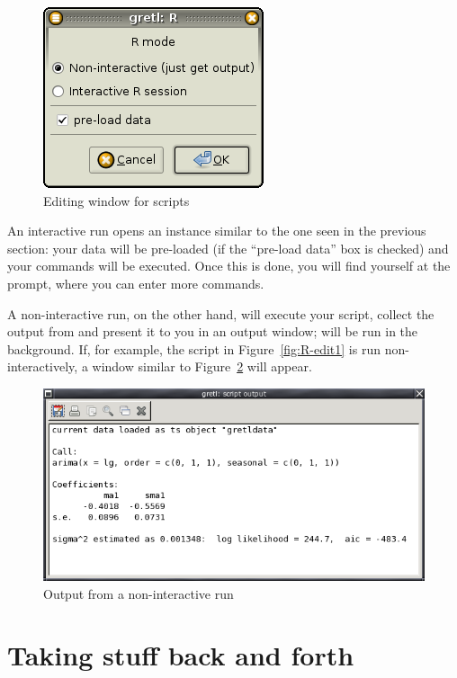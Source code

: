 \begin{figure}[htbp]
  \centering
  \includegraphics[scale=0.7]{figures/R-exec-mode}
  \caption{Editing window for  scripts}
  \label{fig:R-exec-mode}
\end{figure}

An interactive run opens an  instance similar to the one seen
in the previous section: your data will be pre-loaded (if the
``pre-load data'' box is checked) and your commands will
be executed. Once this is done, you will find yourself at the 
prompt, where you can enter more commands.

A non-interactive run, on the other hand, will execute your script,
collect the output from  and present it to you in an output
window;  will be run in the background. If, for example, the
script in Figure~\ref{fig:R-edit1} is run non-interactively, a window
similar to Figure~\ref{fig:R-output1} will appear.

\begin{figure}[htbp]
  \centering
  \includegraphics[scale=0.7]{figures/R-output1}
  \caption{Output from a non-interactive  run}
  \label{fig:R-output1}
\end{figure}

\section{Taking stuff back and forth}
\label{sec:R-passing-data}

